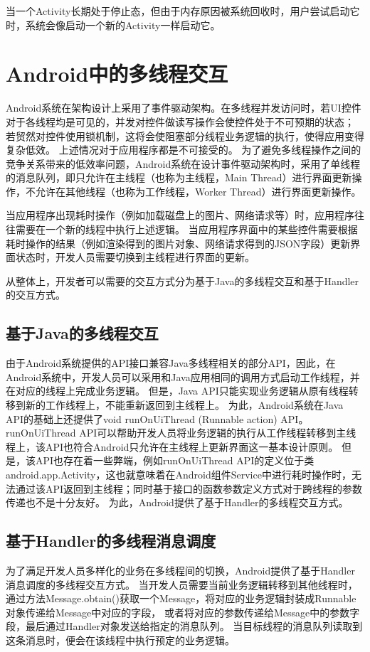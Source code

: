 当一个Activity长期处于停止态，但由于内存原因被系统回收时，用户尝试启动它时，系统会像启动一个新的Activity一样启动它。

\section{Android中的多线程交互}
Android系统在架构设计上采用了事件驱动架构。在多线程并发访问时，若UI控件对于各线程均是可见的，并发对控件做读写操作会使控件处于不可预期的状态；
若贸然对控件使用锁机制，这将会使阻塞部分线程业务逻辑的执行，使得应用变得复杂低效。
上述情况对于应用程序都是不可接受的。
为了避免多线程操作之间的竞争关系带来的低效率问题，Android系统在设计事件驱动架构时，采用了单线程的消息队列，即只允许在主线程（也称为主线程，Main Thread）进行界面更新操作，不允许在其他线程（也称为工作线程，Worker Thread）进行界面更新操作。

当应用程序出现耗时操作（例如加载磁盘上的图片、网络请求等）时，应用程序往往需要在一个新的线程中执行上述逻辑。
当应用程序界面中的某些控件需要根据耗时操作的结果（例如渲染得到的图片对象、网络请求得到的JSON字段）更新界面状态时，开发人员需要切换到主线程进行界面的更新。

从整体上，开发者可以需要的交互方式分为基于Java的多线程交互和基于Handler的交互方式。

\subsection{基于Java的多线程交互}

由于Android系统提供的API接口兼容Java多线程相关的部分API，因此，在Android系统中，开发人员可以采用和Java应用相同的调用方式启动工作线程，并在对应的线程上完成业务逻辑。
但是，Java API只能实现业务逻辑从原有线程转移到新的工作线程上，不能重新返回到主线程上。
为此，Android系统在Java API的基础上还提供了void runOnUiThread (Runnable action) API。
runOnUiThread API可以帮助开发人员将业务逻辑的执行从工作线程转移到主线程上，该API也符合Android只允许在主线程上更新界面这一基本设计原则。
但是，该API也存在着一些弊端，例如runOnUiThread API的定义位于类android.app.Activity，这也就意味着在Android组件Service中进行耗时操作时，无法通过该API返回到主线程；同时基于接口的函数参数定义方式对于跨线程的参数传递也不是十分友好。
为此，Android提供了基于Handler的多线程交互方式。

\subsection{基于Handler的多线程消息调度}

为了满足开发人员多样化的业务在多线程间的切换，Android提供了基于Handler消息调度的多线程交互方式。
当开发人员需要当前业务逻辑转移到其他线程时，通过方法Message.obtain()获取一个Message，将对应的业务逻辑封装成Runnable对象传递给Message中对应的字段，
或者将对应的参数传递给Message中的参数字段，最后通过Handler对象发送给指定的消息队列。
当目标线程的消息队列读取到这条消息时，便会在该线程中执行预定的业务逻辑。


